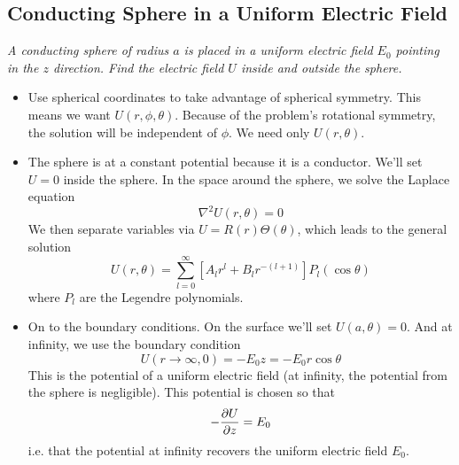 \documentclass[11pt, a4paper]{article}
\renewcommand{\laplacian}{\nabla^{2}}
\begin{document}
\subsection{Conducting Sphere in a Uniform Electric Field}
\textit{A conducting sphere of radius $ a $ is placed in a uniform electric field $ E_{0} $ pointing in the $ z $ direction. Find the electric field $ U $ inside and outside the sphere.} 

\begin{itemize}
	\item Use spherical coordinates to take advantage of spherical symmetry. This means we want $ U(r, \phi, \theta) $. Because of the problem's rotational symmetry, the solution will be independent of $ \phi $. We need only $ U(r, \theta) $. 
	
	\item The sphere is at a constant potential because it is a conductor. We'll set $ U = 0 $ inside the sphere. In the space around the sphere, we solve the Laplace equation
	\begin{equation*}
		\laplacian U(r, \theta) = 0
	\end{equation*}
	We then separate variables via $ U = R(r)\Theta(\theta) $, which leads to the general solution
	\begin{equation*}
		U(r, \theta) = \sum_{l = 0}^{\infty} \left[A_{l}r^{l}+B_{l}r^{-(l+1)}\right]P_{l}(\cos \theta)
	\end{equation*}
	where $ P_{l} $ are the Legendre polynomials. 
	
	\item On to the boundary conditions. On the surface we'll set $ U(a, \theta) = 0 $. And at infinity, we use the boundary condition 
	\begin{equation*}
		U(r \to \infty, 0) = - E_{0}z = -E_{0}r \cos \theta
	\end{equation*}
	This is the potential of a uniform electric field (at infinity, the potential from the sphere is negligible). This potential is chosen so that
	\begin{equation*}
		- \pdv{U}{z} = E_{0}
	\end{equation*}
	i.e. that the potential at infinity recovers the uniform electric field $ E_{0} $. 
	

\end{itemize}
\end{document}
